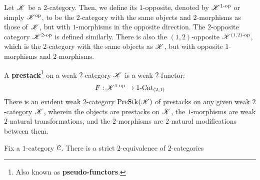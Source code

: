             \begin{convention} \label{conv: 1_opposite_and_2_opposite_categories}
                Let $\mathscr{K}$ be a $2$-category. Then, we define its $1$-opposite, denoted by $\mathscr{K}^{1\text{-}\mathrm{op}}$ or simply $\mathscr{K}^{\mathrm{op}}$, to be the $2$-category with the same objects and $2$-morphisms as those of $\mathscr{K}$, but with $1$-morphisms in the opposite direction. The $2$-opposite category $\mathscr{K}^{2\text{-}\mathrm{op}}$ is defined similarly. There is also the $(1, 2)$-opposite $\mathscr{K}^{(1, 2)\text{-}\mathrm{op}}$, which is the $2$-category with the same objects as $\mathscr{K}$, but with opposite $1$-morphisms and $2$-morphisms.
            \end{convention}
            \begin{definition}[Prestacks] \label{def: prestacks}
                A \textbf{prestack}\footnote{Also known as \textbf{pseudo-functors}.} on a weak $2$-category $\mathscr{K}$ is a weak $2$-functor:
                    $$F: \mathscr{K}^{1\text{-}\mathrm{op}} \to 1\text{-}\mathrm{Cat}_{(2, 1)}$$
                There is an evident weak $2$-category $\mathrm{Pre}\mathrm{Stk}(\mathscr{K})$ of prestacks on any given weak $2$-category $\mathscr{K}$, wherein the objects are prestacks on $\mathscr{K}$, the $1$-morphisms are weak $2$-natural transformations, and the $2$-morphisms are $2$-natural modifications between them.
            \end{definition}
            \begin{theorem} \label{theorem: grothendieck_construction}
                Fix a $1$-category $\mathcal{C}$. There is a strict $2$-equivalence of $2$-categories
            \end{theorem}
            

